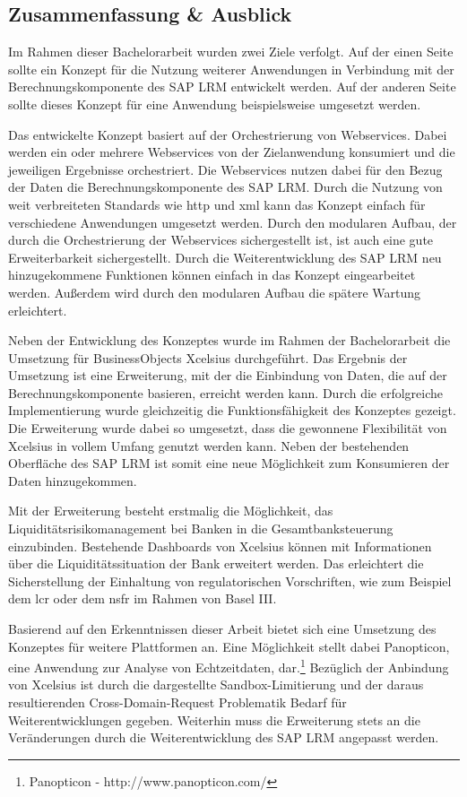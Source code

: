 \begin{onehalfspacing}
\chapter{Zusammenfassung \& Ausblick}

Im Rahmen dieser Bachelorarbeit wurden zwei Ziele verfolgt. Auf der einen Seite sollte ein Konzept für die Nutzung weiterer Anwendungen in Verbindung mit der Berechnungskomponente des SAP LRM entwickelt werden. Auf der anderen Seite sollte dieses Konzept für eine Anwendung beispielsweise umgesetzt werden. 

Das entwickelte Konzept basiert auf der Orchestrierung von Webservices. Dabei werden ein oder mehrere Webservices von der Zielanwendung konsumiert und die jeweiligen Ergebnisse orchestriert. Die Webservices nutzen dabei für den Bezug der Daten die Berechnungskomponente des SAP LRM. Durch die Nutzung von weit verbreiteten Standards wie \gls{http} und \gls{xml} kann das Konzept einfach für verschiedene Anwendungen umgesetzt werden. Durch den modularen Aufbau, der durch die Orchestrierung der Webservices sichergestellt ist, ist auch eine gute Erweiterbarkeit sichergestellt. Durch die Weiterentwicklung des SAP LRM neu hinzugekommene Funktionen können einfach in das Konzept eingearbeitet werden. Außerdem wird durch den modularen Aufbau die spätere Wartung erleichtert.

Neben der Entwicklung des Konzeptes wurde im Rahmen der Bachelorarbeit die Umsetzung für BusinessObjects Xcelsius durchgeführt. Das Ergebnis der Umsetzung ist eine Erweiterung, mit der die Einbindung von Daten, die auf der Berechnungskomponente basieren, erreicht werden kann. Durch die erfolgreiche Implementierung wurde gleichzeitig die Funktionsfähigkeit des Konzeptes gezeigt. Die Erweiterung wurde dabei so umgesetzt, dass die gewonnene Flexibilität von Xcelsius in vollem Umfang genutzt werden kann. Neben der bestehenden Oberfläche des SAP LRM ist somit eine neue Möglichkeit zum Konsumieren der Daten hinzugekommen.

Mit der Erweiterung besteht erstmalig die Möglichkeit, das Liquiditätsrisikomanagement bei Banken in die Gesamtbanksteuerung einzubinden. Bestehende Dashboards von Xcelsius können mit Informationen über die Liquiditätssituation der Bank erweitert werden. Das erleichtert die Sicherstellung der Einhaltung von regulatorischen Vorschriften, wie zum Beispiel dem \gls{lcr} oder dem \gls{nsfr} im Rahmen von Basel III.

Basierend auf den Erkenntnissen dieser Arbeit bietet sich eine Umsetzung des Konzeptes für weitere Plattformen an. Eine Möglichkeit stellt dabei Panopticon, eine Anwendung zur Analyse von Echtzeitdaten, dar.\footnote{Panopticon - http://www.panopticon.com/} Bezüglich der Anbindung von Xcelsius ist durch die dargestellte Sandbox-Limitierung und der daraus resultierenden Cross-Domain-Request Problematik Bedarf für Weiterentwicklungen gegeben. Weiterhin muss die Erweiterung stets an die Veränderungen durch die Weiterentwicklung des SAP LRM angepasst werden.


\end{onehalfspacing}
